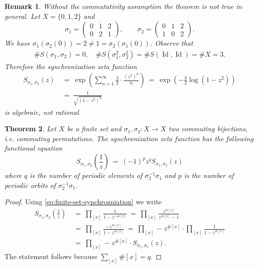 \documentclass[oneside]{amsart}
\def\Id{\operatorname{Id}}
\newtheorem{thm}{Theorem}
\newtheorem{rmk}[thm]{Remark}
\begin{document}
\begin{rmk} \label{thm:example-synchronization-finite-algebraic}
  Without the commutativity assumption the theorem is not true in general.
  Let $X = \{0, 1, 2\}$ and
  \begin{equation*}
    \sigma_1 = \begin{pmatrix}0 & 1 & 2 \\ 0 & 2 & 1\end{pmatrix}, \qquad
    \sigma_2 = \begin{pmatrix}0 & 1 & 2 \\ 1 & 0 & 2\end{pmatrix}.
  \end{equation*}
  We have $\sigma_1 \left( \sigma_2(0) \right) = 2 \neq 1 = \sigma_2 \left( \sigma_1(0) \right)$.
  Observe that
  \begin{align*}
    \# S(\sigma_1, \sigma_2) = 0, \quad \# S(\sigma_1^2, \sigma_2^2) = \# S(\Id, \Id) = \# X = 3.
  \end{align*}
  Therefore the synchronization zeta function
  \begin{align*}
    S_{\sigma_1, \sigma_2}(z) \ &= \ \exp \left( \sum_{n=1}^\infty \frac{3}{2} \cdot \frac{(z^2)^n}{n} \right)
      \ = \ \exp \left( -\frac{3}{2} \log(1-z^2) \right) \\
    &= \ \frac{1}{\sqrt{(1-z^2)^3}}
  \end{align*}
  is \emph{algebraic}, not rational.
\end{rmk}


\begin{thm}
  Let $X$ be a finite set and $\sigma_1, \sigma_2: X \to X$ two commuting bijections, i.e. commuting permutations.
  The synchronization zeta function has the following functional equation
  \begin{equation*}
    S_{\sigma_1, \sigma_2} \left( \frac{1}{z} \right) \ = \ (-1)^p z^q S_{\sigma_1, \sigma_2}(z)
  \end{equation*}
  where $q$ is the number of periodic elements of $\sigma_2^{-1}\sigma_1$
  and $p$ is the number of periodic orbits of $\sigma_2^{-1}\sigma_1$.
\end{thm}
\begin{proof}
  Using \eqref{eq:finite-set-synchrozniation} we write
  \begin{align*}
    S_{\sigma_1, \sigma_2}\left(\frac{1}{z}\right) \ &= \ \prod_{[x]} \frac{1}{1 - z^{-\#[x]}}
      \ = \ \prod_{[x]} \frac{z^{\#[x]}}{z^{\#[x]} - 1} \\
    &= \ \prod_{[x]} \frac{-z^{\#[x]}}{1 - z^{\#[x]}}
      \ = \ \prod_{[x]} -z^{\#[x]} \cdot \prod_{[x]} \frac{1}{1 - z^{\#[x]}} \\
    &= \ \prod_{[x]} -z^{\#[x]} \cdot S_{\sigma_1, \sigma_2}(z).
  \end{align*}
  The statement follows because $\sum_{[x]} \# [x] = q$.
\end{proof}
\end{document}
